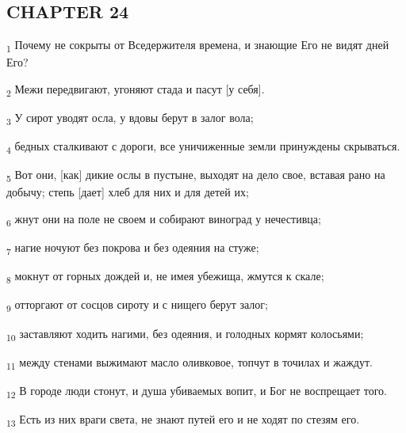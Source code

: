 \subsection{CHAPTER 24}
\begin{tcolorbox}
\textsubscript{1} Почему не сокрыты от Вседержителя времена, и знающие Его не видят дней Его?
\end{tcolorbox}
\begin{tcolorbox}
\textsubscript{2} Межи передвигают, угоняют стада и пасут [у себя].
\end{tcolorbox}
\begin{tcolorbox}
\textsubscript{3} У сирот уводят осла, у вдовы берут в залог вола;
\end{tcolorbox}
\begin{tcolorbox}
\textsubscript{4} бедных сталкивают с дороги, все уничиженные земли принуждены скрываться.
\end{tcolorbox}
\begin{tcolorbox}
\textsubscript{5} Вот они, [как] дикие ослы в пустыне, выходят на дело свое, вставая рано на добычу; степь [дает] хлеб для них и для детей их;
\end{tcolorbox}
\begin{tcolorbox}
\textsubscript{6} жнут они на поле не своем и собирают виноград у нечестивца;
\end{tcolorbox}
\begin{tcolorbox}
\textsubscript{7} нагие ночуют без покрова и без одеяния на стуже;
\end{tcolorbox}
\begin{tcolorbox}
\textsubscript{8} мокнут от горных дождей и, не имея убежища, жмутся к скале;
\end{tcolorbox}
\begin{tcolorbox}
\textsubscript{9} отторгают от сосцов сироту и с нищего берут залог;
\end{tcolorbox}
\begin{tcolorbox}
\textsubscript{10} заставляют ходить нагими, без одеяния, и голодных кормят колосьями;
\end{tcolorbox}
\begin{tcolorbox}
\textsubscript{11} между стенами выжимают масло оливковое, топчут в точилах и жаждут.
\end{tcolorbox}
\begin{tcolorbox}
\textsubscript{12} В городе люди стонут, и душа убиваемых вопит, и Бог не воспрещает того.
\end{tcolorbox}
\begin{tcolorbox}
\textsubscript{13} Есть из них враги света, не знают путей его и не ходят по стезям его.
\end{tcolorbox}
